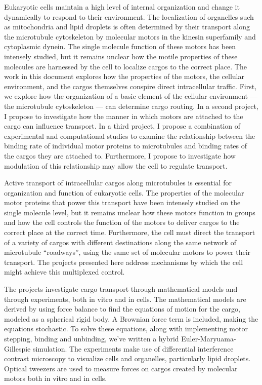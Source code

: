 \thesisabstract
{
  Eukaryotic cells maintain a high level of internal organization and change it dynamically to respond to their environment. The localization of organelles such as mitochondria and lipid droplets is often determined by their transport along the microtubule cytoskeleton by molecular motors in the kinesin superfamily and cytoplasmic dynein. The single molecule function of these motors has been intensely studied, but it remains unclear how the motile properties of these molecules are harnessed by the cell to localize cargos to the correct place. The work in this document explores how the properties of the motors, the cellular environment, and the cargos themselves conspire direct intracellular traffic. First, we explore how the organization of a basic element of the cellular environment --- the microtubule cytoskeleton --- can determine cargo routing. In a second project, I propose to investigate how the manner in which motors are attached to the cargo can influence transport. In a third project, I propose a combination of experimental and computational studies to examine the relationship between the binding rate of individual motor proteins to microtubules and binding rates of the cargos they are attached to. Furthermore, I propose to investigate how modulation of this relationship may allow the cell to regulate transport.
  
   Active transport of intracellular cargos along microtubules is essential for organization and function of eukaryotic cells. The properties of the molecular motor proteins that power this transport have been intensely studied on the single molecule level, but it remains unclear how these motors function in groups and how the cell controls the function of the motors to deliver cargos to the correct place at the correct time. Furthermore, the cell must direct the transport of a variety of cargos with different destinations along the same network of microtubule ``roadways'', using the same set of molecular motors to power their transport. The projects presented here address mechanisms by which the cell might achieve this multiplexed control.

The projects investigate cargo transport through mathematical models and through experiments, both in vitro and in cells. The mathematical models are derived by using force balance to find the equations of motion for the cargo, modeled as a spherical rigid body. A Brownian force term is included, making the equations stochastic. To solve these equations, along with implementing motor stepping, binding and unbinding, we've written a hybrid Euler-Maryuama-Gillespie simulation. The experiments make use of differential interference contrast microscopy to visualize cells and organelles, particularly lipid droplets. Optical tweezers are used to measure forces on cargos created by molecular motors both in vitro and in cells.
  
}
